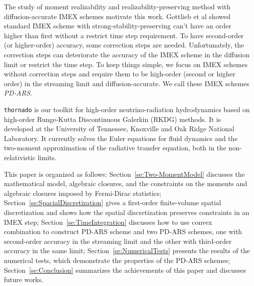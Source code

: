 The study of moment realizability and realizability-preserving method with diffusion-accurate IMEX schemes motivate this work.
Gottlieb et al\cite{gottlieb_etal_2001} showed standard IMEX scheme with strong-stability-preserving can't have an order higher than first without a restrict time step requirement.
To have second-order (or higher-order) accuracy, some correction steps are needed.
Unfortunately, the correction steps can deteriorate the accuracy of the IMEX scheme in the diffusion limit or restrict the time step.
To keep things simple, we focus on IMEX schemes without correction steps and require them to be high-order (second or higher order) in the streaming limit and diffusion-accurate.
We call these IMEX schemes \textit{PD-ARS}.

\texttt{thornado} is our toolkit for high-order neutrino-radiation hydrodynamics based on high-order Runge-Kutta Discontinuous Galerkin (RKDG) methods.
It is developed at the University of Tennessee, Knoxville and Oak Ridge National Laboratory.
It currently solves the Euler equations for fluid dynamics and the two-moment approximation of the radiative transfer equation, both in the non-relativistic limits.\cite{endeve_etal_2018}

This paper is organized as follows: Section~\ref{se:Two-MomentModel} discusses the mathematical model, algebraic closures, and the constraints on the moments and algebraic closures imposed by Fermi-Dirac statistics;
Section~\ref{se:SpacialDiscretization} gives a first-order finite-volume spatial discretization and shows how the spatial discretization preserves constraints in an IMEX step;
Section~\ref{se:TimeIntegration} discusses how to use convex combination to construct PD-ARS scheme and two PD-ARS schemes, one with second-order accuracy in the streaming limit and the other with third-order accuracy in the same limit;
Section~\ref{se:NumericalTests} presents the results of the numerical tests, which demonstrate the properties of the PD-ARS schemes; Section~\ref{se:Conclusion} summarizes the achievements of this paper and discusses future works.

